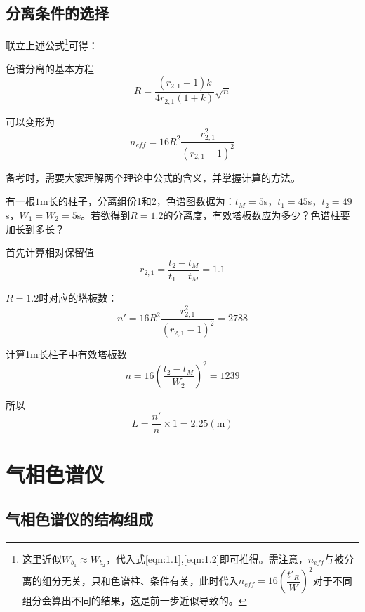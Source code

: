 \subsection{分离条件的选择}
联立上述公式\footnote{这里近似$W_{b_1}\approx W_{b_2}$，代入式\eqref{eqn:1.1},\eqref{eqn:1.2}即可推得。需注意，$n_{eff}$与被分离的组分无关，只和色谱柱、条件有关，此时代入$n_{eff}=16{\left(\dfrac{t'_R}{W}\right)}^2$对于不同组分会算出不同的结果，这是前一步近似导致的。}可得：

\begin{theorem*}{色谱分离的基本方程}{}
	\begin{equation}
	R=\dfrac{(r_{2,1}-1)k}{4r_{2,1} (1+k)} \sqrt{n}
	\end{equation}
	
	可以变形为
	\begin{equation}
	n_{eff}=16R^2\dfrac{r_{2,1}^2}{(r_{2,1}-1)^2}
	\end{equation}
\end{theorem*}

备考时，需要大家理解两个理论中公式的含义，并掌握计算的方法。
\vspace{3pt}
\begin{example}
	有一根$1$m长的柱子，分离组份1和2，色谱图数据为：$t_M=5$s，$t_1=45$s，$t_2=49$s，$W_1=W_2=5$s。若欲得到$R=1.2$的分离度，有效塔板数应为多少？色谱柱要加长到多长？
	
	\solve 
	首先计算相对保留值$$r_{2,1}=\dfrac{t_2-t_M}{t_1-t_M}=1.1$$
	
	$R=1.2$时对应的塔板数：$$n'=16R^2\dfrac{r_{2,1}^2}{(r_{2,1}-1)^2}=2788$$
	
	计算1m长柱子中有效塔板数$$n=16{\left(\dfrac{t_2-t_M}{W_2}\right)}^2=1239$$
	
	所以$$L=\dfrac{n'}{n}\times 1=2.25(\mathrm{m})$$
	
\end{example}


\section{气相色谱仪}
\subsection{气相色谱仪的结构组成}

